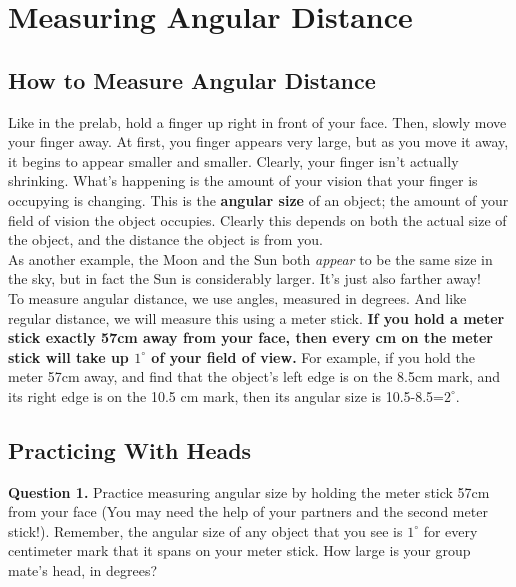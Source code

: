 \documentclass[11pt]{article}
\begin{document}
\newpage

\section{Measuring Angular Distance}

\subsection{How to Measure Angular Distance}
Like in the prelab, hold a finger up right in front of your face. Then, slowly move your finger away. At first, you finger appears very large, but as you move it away, it begins to appear smaller and smaller. Clearly, your finger isn't actually shrinking. What's happening is the amount of your vision that your finger is occupying is changing. This is the \textbf{angular size} of an object; the amount of your field of vision the object occupies. Clearly this depends on both the actual size of the object, and the distance the object is from you.\\

As another example, the Moon and the Sun both \textit{appear} to be the same size in the sky, but in fact the Sun is considerably larger. It's just also farther away!\\

To measure angular distance, we use angles, measured in degrees. And like regular distance, we will measure this using a meter stick. \textbf{If you hold a meter stick exactly 57cm away from your face, then every cm on the meter stick will take up $1^\circ$ of your field of view.} For example, if you hold the meter 57cm away, and find that the object's left edge is on the 8.5cm mark, and its right edge is on the 10.5 cm mark, then its angular size is 10.5-8.5=$2^\circ$.\\

\subsection{Practicing With Heads}

\textbf{Question 1.} Practice measuring angular size by holding the meter stick 57cm from your face (You may need the help of your partners and the second meter stick!).
Remember, the angular size of any object that you see is $1^\circ$ for every centimeter mark that it spans on your meter stick. How large is your group mate's head, in degrees?\\
\end{document}
